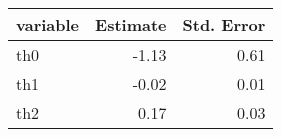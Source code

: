 \begin{tabular}{lrr}
  \hline
variable & Estimate & Std. Error \\ 
  \hline
th0 & -1.13 & 0.61 \\ 
  th1 & -0.02 & 0.01 \\ 
  th2 & 0.17 & 0.03 \\ 
   \hline
\end{tabular}
